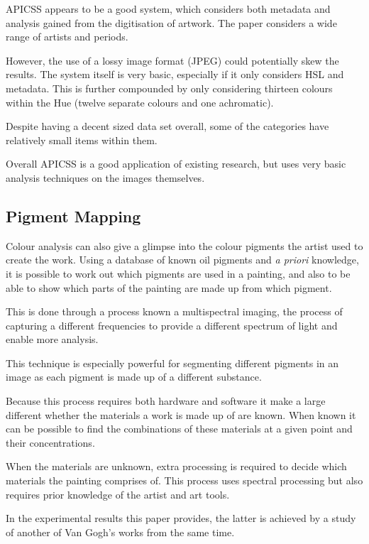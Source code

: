\documentclass[conference]{IEEEtran}
\begin{document}
\gls{APICSS} appears to be a good system, which considers both metadata and
analysis gained from the digitisation of artwork. The paper considers a wide
range of artists and periods.

However, the use of a lossy image format (JPEG) could potentially skew the
results. The system itself is very basic, especially if it only considers
\gls{HSL} and metadata. This is further compounded by only considering thirteen
colours within the Hue (twelve separate colours and one achromatic).

Despite having a decent sized data set overall, some of the categories have
relatively small items within them.

Overall \gls{APICSS} is a good application of existing research, but uses very
basic analysis techniques on the images themselves.


\subsection{Pigment Mapping}
Colour analysis can also give a glimpse into the colour pigments the artist
used to create the work. Using a database of known oil pigments and
\textit{a priori} knowledge, it is possible to work out which pigments are used
in a painting, and also to be able to show which parts of the painting are made
up from which pigment\cite{zhao2008investigation}.

This is done through a process known a multispectral imaging, the process of
capturing a different frequencies to provide a different spectrum of light and
enable more analysis.

This technique is especially powerful for segmenting different pigments in an
image as each pigment is made up of a different substance.

Because this process requires both hardware and software it make a large
different whether the materials a work is made up of are known. When known it
can be possible to find the combinations of these materials at a given point
and their concentrations.

When the materials are unknown, extra processing is required to decide which
materials the painting comprises of. This process uses spectral processing but
also requires prior knowledge of the artist and art tools.

In the experimental results this paper provides, the latter is achieved by a
study of another of Van Gogh's works from the same time.
\end{document}
